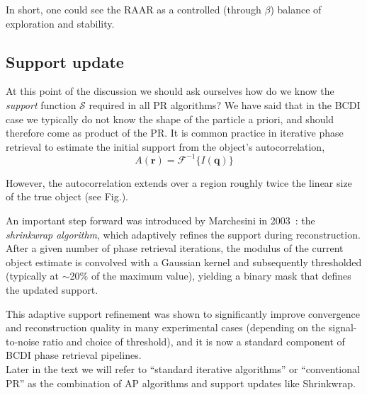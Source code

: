 In short, one could see the RAAR as a controlled (through $\beta$) balance of exploration and stability. 

\subsection{Support update}
At this point of the discussion we should ask ourselves how do we know the \textit{support} function $\mathcal{S}$
required in all PR algorithms? We have said that in the BCDI case we typically do not know the shape of the particle 
a priori, and should therefore come as product of the PR.  
It is common practice in iterative phase retrieval to estimate the initial support 
from the object's autocorrelation,
\begin{equation}
    A(\mathbf{r}) = \mathcal{F}^{-1}\{ I(\mathbf{q}) \}
\end{equation}

However, the autocorrelation extends over a region roughly twice the linear size of the true object (see Fig.). 

An important step forward was introduced by Marchesini in 2003~\cite{Marchesini_shrinkwrap}: 
the \textit{shrinkwrap algorithm}, which adaptively refines the support during reconstruction. 
After a given number of phase retrieval iterations, the modulus of the current object estimate is 
convolved with a Gaussian kernel and subsequently thresholded (typically at $\sim$20\% of the maximum value), 
yielding a binary mask that defines the updated support. 

This adaptive support refinement was shown to significantly improve convergence and reconstruction quality 
in many experimental cases (depending on the signal-to-noise ratio and choice of threshold), and it is now a 
standard component of BCDI phase retrieval pipelines.\\

Later in the text we will refer to ``standard iterative algorithms'' or ``conventional PR'' as the combination of AP 
algorithms and support updates like Shrinkwrap. 



